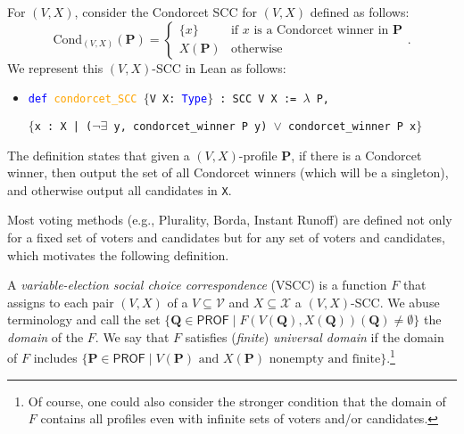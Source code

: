 \documentclass[runningheads]{llncs}
\begin{document}

\begin{example}\label{CondorcetEx1} For $(V,X)$, consider the Condorcet SCC for $(V,X)$ defined as follows:
\[\mathrm{Cond}_{(V,X)}(\mathbf{P})=\begin{cases} \{x\} & \mbox{if $x$ is a Condorcet winner in $\mathbf{P}$} \\ X(\mathbf{P}) & \mbox{otherwise}\end{cases}.\]
We represent this $(V,X)$-SCC in Lean as follows:
\begin{itemize}
\item[] \texttt{\textcolor{blue}{def} \textcolor{orange}{condorcet\_SCC} $\{$V X: \textcolor{blue}{Type}$\}$ : SCC V X := $\lambda$ P, }

\texttt{$\{$x : X | ($\neg \exists$ y, condorcet\_winner P y) $\vee$ condorcet\_winner P x$\}$}
\end{itemize}
The definition states that given a $(V,X)$-profile $\mathbf{P}$, if there is a Condorcet winner, then output the set of all Condorcet winners (which will be a singleton), and otherwise output all candidates in \texttt{X}.
\end{example}

Most voting methods (e.g., Plurality, Borda, Instant Runoff) are defined not only for a fixed set of voters and candidates but for any set of voters and candidates, which motivates the following definition.

\begin{definition}\label{VSCC} \textnormal{A \textit{variable-election social choice correspondence} (VSCC) is a function $F$ that assigns to each pair $(V,X)$ of a $V\subseteq \mathcal{V}$ and $X\subseteq\mathcal{X}$ a $(V,X)$-SCC. We abuse terminology and call the set $\{\mathbf{Q}\in\mathsf{PROF}\mid F(V(\mathbf{Q}),X(\mathbf{Q}))(\mathbf{Q})\neq\emptyset \}$ the \textit{domain} of the $F$. We say that $F$ satisfies  (\textit{finite}) \textit{universal domain} if the domain of $F$ includes $\{\mathbf{P}\in \mathsf{PROF}\mid V(\mathbf{P}) \mbox{ and }X(\mathbf{P}) \mbox{ nonempty and finite}\}$.}\footnote{Of course, one could also consider the stronger condition that the domain of $F$ contains all profiles even with infinite sets of voters and/or candidates.}
\end{definition}
\end{document}
